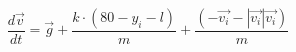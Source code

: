 \documentclass[preview]{standalone}
\begin{document}
\begin{center}
$$\frac{d\vec{v}}{dt}=\vec{g}+\frac{k\cdot(80-y_i-l)}{m}+\frac{(-\vec{v_i}-|\vec{v_i}|\vec{v_i})}{m}$$
\end{center}
\end{document}
